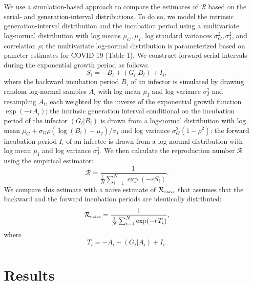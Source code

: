 \documentclass[12pt]{article}
\begin{document}
We use a simulation-based approach to compare the estimates of $\mathcal R$ based on the serial- and generation-interval distributions. 
To do so, we model the intrinsic generation-interval distribution and the incubation period using a multivariate log-normal distribution with log means $\mu_G, \mu_I$, log standard variances $\sigma_G^2, \sigma_I^2$, and correlation $\rho$;
the multivariate log-normal distribution is parameterized based on pameter estimates for COVID-19 (Table 1).
We construct forward serial intervals during the exponential growth period as follows:
\begin{equation}
S_i = -B_i + (G_i|B_i) + I_i,
\end{equation}
where the backward incubation period $B_i$ of an infector is simulated by drawing random log-normal samples $A_i$ with log mean $\mu_I$ and log variance $\sigma_I^2$ and resampling $A_i$, each weighted by the inverse of the exponential growth function $\exp(-rA_i)$;
the intrinsic generation interval conditional on the incubation period of the infector $(G_i|B_i)$ is drawn from a log-normal distribution with log mean $\mu_G + \sigma_G \rho (\log(B_i) - \mu_I)/\sigma_I$ and log variance $\sigma_G^2 (1-\rho^2)$;
the forward incubation period $I_i$ of an infectee is drawn from a log-normal distribution with log mean $\mu_I$ and log variance $\sigma_I^2$.
We then calculate the reproduction number $\mathcal R$ using the empirical estimator:
\begin{equation}
\mathcal R = \frac{1}{\frac{1}{N}\sum_{i=1}^N \exp(- r S_i)}.
\end{equation}
We compare this estimate with a naive estimate of ${\mathcal R}_{\textrm{\tiny naive}}$ that assumes that the backward and the forward incubation periods are identically distributed:
\begin{equation}
{\mathcal R}_{\textrm{\tiny naive}} = \frac{1}{\frac{1}{N}\sum_{i=1}^N \exp(- r T_i)},
\end{equation}
where
\begin{equation}
T_i = -A_i + (G_i|A_i) + I_i.
\end{equation}

\section{Results}
\end{document}
